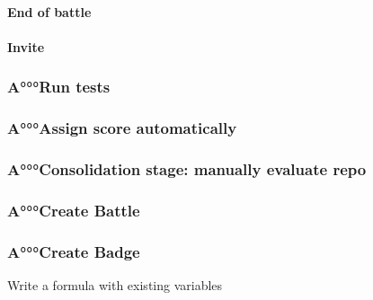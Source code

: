 \documentclass{article}
\begin{document}
                \paragraph*{End of battle}
                \paragraph*{Invite}
            \subsubsection{A°°°Run tests}
            \subsubsection{A°°°Assign score automatically}
            \subsubsection{A°°°Consolidation stage: manually evaluate repo}
            \subsubsection{A°°°Create Battle}
            \subsubsection{A°°°Create Badge}
                Write a formula with existing variables
\end{document}
